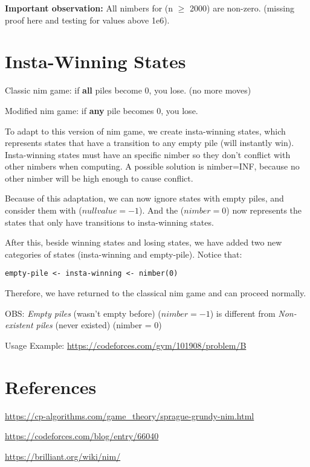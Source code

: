 \textbf{Important observation:} All nimbers for (n $\ge$ 2000) are non-zero.
(missing proof here and testing for values above 1e6).

\section{Insta-Winning States}

Classic nim game: if \textbf{all} piles become 0, you lose. (no more moves)

Modified nim game: if \textbf{any} pile becomes 0, you lose.

To adapt to this version of nim game, we create insta-winning states,
which represents states that have a transition to any empty pile (will instantly win).
Insta-winning states must have an specific nimber so they don't conflict with other nimbers when computing.
A possible solution is nimber=INF, because no other nimber will be high enough to cause conflict. 

Because of this adaptation, we can now ignore states with empty piles, and consider them with ($null value = -1$).
And the ($nimber = 0$) now represents the states that only have transitions to insta-winning states.

After this, beside winning states and losing states, we have added two new categories of states
(insta-winning and empty-pile). Notice that:

\begin{lstlisting}[language=raw]
empty-pile <- insta-winning <- nimber(0)
\end{lstlisting}

Therefore, we have returned to the classical nim game and can proceed normally.

OBS: \textit{Empty piles} (wasn't empty before) ($nimber = -1$) is different from \textit{Non-existent piles} (never existed) (nimber = 0)

Usage Example: \url{https://codeforces.com/gym/101908/problem/B}

\section{References}

\url{https://cp-algorithms.com/game_theory/sprague-grundy-nim.html}

\url{https://codeforces.com/blog/entry/66040}

\url{https://brilliant.org/wiki/nim/}